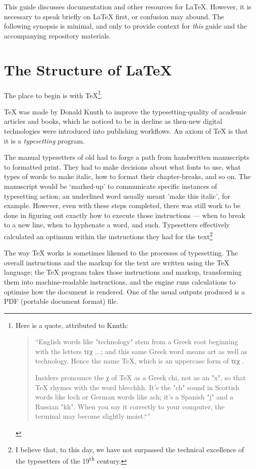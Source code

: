\documentclass[11pt, oneside]{memoir}
\begin{document}
This guide discusses documentation and other resources for LaTeX. However, it is necessary to speak briefly on LaTeX first, or confusion may abound. The following synopsis is minimal, and only to provide context for \emph{this} guide and the accompanying repository materials.

\newpage
\section{The Structure of \LaTeX{}}

The place to begin is with \TeX{}\footnote{Here is a quote, attributed to Knuth: \begin{quotation}``English words like "technology" stem from a Greek root beginning with the letters \ebg τεχ \nf ...; and this same Greek word means art as well as technology. Hence the name TeX, which is an uppercase form of \ebg τεχ \nf.

Insiders pronounce the χ of TeX as a Greek chi, not as an "x", so that TeX rhymes with the word blecchhh. It’s the "ch" sound in Scottish words like loch or German words like ach; it’s a Spanish "j" and a Russian "kh". When you say it correctly to your computer, the terminal may become slightly moist.``''\end{quotation}}.

TeX was made by Donald Knuth to improve the typesetting-quality of academic articles and books, which he noticed to be in decline as then-new digital technologies were introduced into publishing workflows. An axiom of \TeX{} is that it is a \emph{typesetting} program.

The manual typesetters of old had to forge a path from handwritten manuscripts to formatted print. They had to make decisions about what fonts to use, what types of words to make italic, how to format their chapter-breaks, and so on. The manuscript would be `marked-up' to communicate specific instances of typesetting action; an underlined word usually meant 'make this italic', for example. However, even with these steps completed, there was still work to be done in figuring out exactly how to execute those instructions — when to break to a new line, when to hyphenate a word, and such. Typesetters effectively calculated an optimum within the instructions they had for the text\footnote{I believe that, to this day, we have not surpassed the technical excellence of the typesetters of the 19\textsuperscript{th} century.}

The way TeX works is sometimes likened to the processes of typesetting. The overall instructions and the markup for the text are written using the TeX language; the TeX program takes those instructions and markup, transforming them into machine-readable instructions, and the engine runs calculations to optimise how the document is rendered. One of the usual outputs produced is a PDF (portable document format) file.
\end{document}
